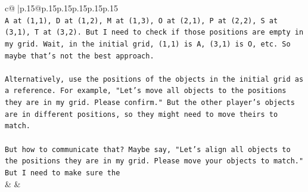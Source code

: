 \documentclass{article}
\begin{document}
{\begin{supertabular}{c@{$\;$}|p{.15\linewidth}@{}p{.15\linewidth}p{.15\linewidth}p{.15\linewidth}p{.15\linewidth}p{.15\linewidth}}
{{{\\ 
\texttt{A at (1,1), D at (1,2), M at (1,3), O at (2,1), P at (2,2), S at (3,1), T at (3,2). But I need to check if those positions are empty in my grid. Wait, in the initial grid, (1,1) is A, (3,1) is O, etc. So maybe that's not the best approach.} \\
\\ 
\texttt{Alternatively, use the positions of the objects in the initial grid as a reference. For example, "Let's move all objects to the positions they are in my grid. Please confirm." But the other player's objects are in different positions, so they might need to move theirs to match.} \\
\\ 
\texttt{But how to communicate that? Maybe say, "Let's align all objects to the positions they are in my grid. Please move your objects to match." But I need to make sure the} \\
            }
        }
    }
    & & \\ \\


\end{supertabular}}
\end{document}
